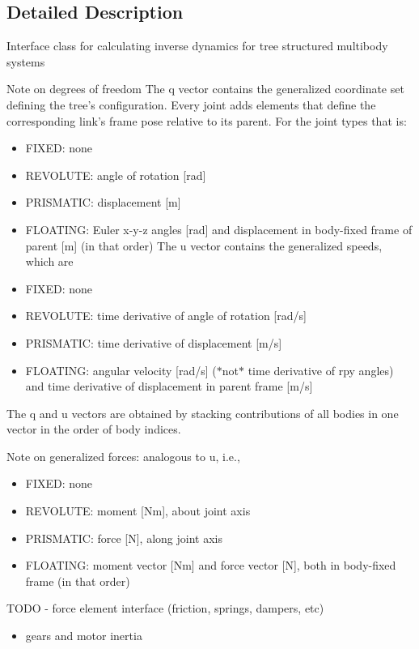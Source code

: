 \subsection{Detailed Description}
Interface class for calculating inverse dynamics for tree structured multibody systems

Note on degrees of freedom The q vector contains the generalized coordinate set defining the tree's configuration. Every joint adds elements that define the corresponding link's frame pose relative to its parent. For the joint types that is:\begin{itemize}
\item FIXED: none\item REVOLUTE: angle of rotation \mbox{[}rad\mbox{]}\item PRISMATIC: displacement \mbox{[}m\mbox{]}\item FLOATING: Euler x-y-z angles \mbox{[}rad\mbox{]} and displacement in body-fixed frame of parent \mbox{[}m\mbox{]} (in that order) The u vector contains the generalized speeds, which are\item FIXED: none\item REVOLUTE: time derivative of angle of rotation \mbox{[}rad/s\mbox{]}\item PRISMATIC: time derivative of displacement \mbox{[}m/s\mbox{]}\item FLOATING: angular velocity \mbox{[}rad/s\mbox{]} ($\ast$not$\ast$ time derivative of rpy angles) and time derivative of displacement in parent frame \mbox{[}m/s\mbox{]}\end{itemize}


The q and u vectors are obtained by stacking contributions of all bodies in one vector in the order of body indices.

Note on generalized forces: analogous to u, i.e.,\begin{itemize}
\item FIXED: none\item REVOLUTE: moment \mbox{[}Nm\mbox{]}, about joint axis\item PRISMATIC: force \mbox{[}N\mbox{]}, along joint axis\item FLOATING: moment vector \mbox{[}Nm\mbox{]} and force vector \mbox{[}N\mbox{]}, both in body-fixed frame (in that order)\end{itemize}


TODO - force element interface (friction, springs, dampers, etc)\begin{itemize}
\item gears and motor inertia \end{itemize}


